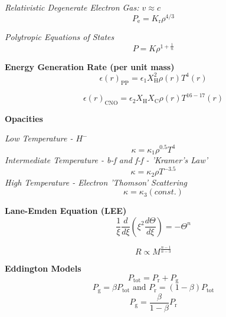 \documentclass{spy}
\begin{document}
\textit {Relativistic Degenerate Electron Gas: \(v \approx c\) }
\begin{equation}
P_\mathrm{e} = K_\mathrm{r} \rho^{4/3}
\end{equation}

\textit {Polytropic Equations of States}
\begin{equation}
P = K \rho^{1+\frac{1}{n}}
\end{equation}



\textbf {Energy Generation Rate (per unit mass)}
\begin{equation}
\epsilon(r)_\mathrm{PP} = \epsilon_1 X^2_\mathrm{H} \rho(r) T^4(r) 
\end{equation}

\begin{equation}
\epsilon(r)_\mathrm{CNO} = \epsilon_\mathrm{2} X_\mathrm{H} X_\mathrm{C} \rho(r) T^{16-17}(r)
\end{equation}

\textbf {Opacities}

\textit {Low Temperature - \(H^-\)}
\begin{equation}
\kappa = \kappa_\mathrm{1} \rho^{0.5} T^4
\end{equation}
\textit {Intermediate Temperature - b-f and f-f - 'Kramer's Law'}
\begin{equation}
\kappa = \kappa_\mathrm{2} \rho T^{-3.5}
\end{equation}
\textit {High Temperature - Electron 'Thomson' Scattering}
\begin{equation}
\kappa = \kappa_\mathrm{3} (const.)
\end{equation}

\textbf {Lane-Emden Equation (LEE)}
\begin{equation}
\frac{1}{\xi} \frac{d}{d\xi} \left( \xi^2 \frac{d\Theta}{d\xi} \right) = -\Theta^n
\end{equation}

\begin{equation}
R \propto M^\frac{n-1}{n-3}
\end{equation}

\textbf {Eddington Models}
\begin{equation}
P_\mathrm{tot} = P_\mathrm{r} + P_\mathrm{g}
\end{equation}
\begin{equation}
P_\mathrm{g} = \beta P_\mathrm{tot} \text{ and } P_\mathrm{r} = (1 - \beta) P_\mathrm{tot}
\end{equation}
\begin{equation}
P_\mathrm{g} = \frac{\beta}{1 - \beta} P_\mathrm{r}
\end{equation}
\end{document}
